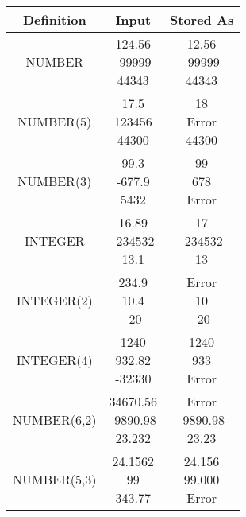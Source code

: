 \begin{center}
\begin{tabular}{|c|c|c|}
    \hline
    Definition & Input & Stored As \\
    \hline
    NUMBER  & \makecell{124.56\\-99999\\44343} & \makecell{12.56\\-99999\\44343} \\
    \hline
    NUMBER(5) & \makecell{17.5\\123456\\44300} & \makecell{18\\Error\\44300} \\
    \hline
    NUMBER(3) & \makecell{99.3\\-677.9\\5432} & \makecell{99\\678\\Error}\\
    \hline
    INTEGER  & \makecell{16.89\\-234532\\13.1} & \makecell{17\\-234532\\13} \\
    \hline
    INTEGER(2)  &   \makecell{234.9\\10.4\\-20} & \makecell{Error\\10\\-20}    \\
    \hline
    INTEGER(4)  &  \makecell{1240\\932.82\\-32330} & \makecell{1240\\933\\Error}  \\
    \hline
    NUMBER(6,2)  &  \makecell{34670.56\\-9890.98\\23.232} & \makecell{Error\\-9890.98\\23.23}  \\
    \hline
    NUMBER(5,3) &  \makecell{24.1562\\99\\343.77} & \makecell{24.156\\99.000\\Error} \\
    \hline
\end{tabular}
\end{center}

